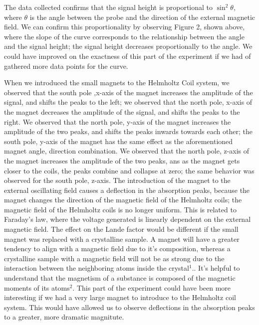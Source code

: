 \documentclass[twoside,10pt]{article}
\begin{document}
\begin{multicols}{2}
The data collected confirms that the signal height is proportional to $\sin^2\theta$, where $\theta$ is the angle between the probe and the direction of the external magnetic field. We can confirm this proportionality by observing Figure 2, shown above, where the slope of the curve corresponds to the relationship between the angle and the signal height; the signal height decreases proportionally to the angle. We could have improved on the exactness of this part of the experiment if we had of gathered more data points for the curve. 

\indent When we introduced the small magnets to the Helmholtz Coil system, we observed that the south pole ,x-axis of the magnet increases the amplitude of the signal, and shifts the peaks to the left; we observed that the north pole, x-axis of the magnet decreases the amplitude of the signal, and shifts the peaks to the right. We observed that the north pole, y-axis of the magnet increases the amplitude of the two peaks, and shifts the peaks inwards towards each other; the south pole, y-axis of the magnet has the same effect as the aforementioned magnet angle, direction combination. We observed that the north pole, z-axis of the magnet increases the amplitude of the two peaks, ans as the magnet gets closer to the coils, the peaks combine and collapse at zero; the same behavior was observed for the south pole, z-axis. The introduction of the magnet to the external oscillating field causes a deflection in the absorption peaks, because the magnet changes the direction of the magnetic field of the Helmholtz coils; the magnetic field of the Helmholtz coils is no longer uniform. This is related to Faraday's law, where the voltage generated is linearly dependent on the external magnetic field. The effect on the Lande factor would be different if the small magnet was replaced with a crystalline sample. A magnet will have a greater tendency to align with a magnetic field due to it's composition, whereas a crystalline sample with a magnetic field will not be as strong due to the interaction between the neighboring atoms inside the crystal$^1$.. It's helpful to understand that the magnetism of a substance is composed of the magnetic moments of its atoms$^2$. This part of the experiment could have been more interesting if we had a very large magnet to introduce to the Helmholtz coil system. This would have allowed us to observe deflections in the absorption peaks to a greater, more dramatic magnitute. 
		
		

\end{multicols}
\end{document}
